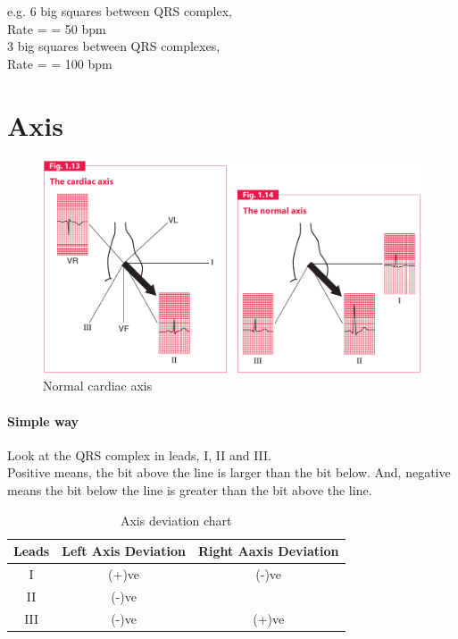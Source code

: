 \documentclass[11pt,a4paper]{report}
\begin{document}
\noindent e.g. 6 big squares between QRS complex,\\
Rate =  = 50 bpm \\
3 big squares between QRS complexes, \\
Rate =  = 100 bpm


\section{Axis}
\begin{figure}[htp]
	\centering \includegraphics[scale=0.43]{CA-NCA.png}
	\centering \caption[Normal cardiac axis]{Normal cardiac axis \cite{hampton2013ecg}}
	\label{Cardiac axis}
\end{figure}

\paragraph{Simple way}
\noindent Look at the QRS complex in leads, I, II and III. \\

\noindent Positive means, the bit above the line is larger than the bit below. And, negative means the bit below the line is greater than the bit above the line. 

\begin{table}[ht]
	\centering
	\caption{Axis deviation chart}
	\begin{tabular}{c c c} 
		\toprule[1.5pt]
		Leads 		 	& Left Axis Deviation 	& Right Aaxis Deviation \\  
		\midrule
		I				& (+)ve 		 		& (-)ve \\ 
		II  			& (-)ve  				&  \\
		III	 			& (-)ve  				& (+)ve \\
		\bottomrule[1.5pt]
	\end{tabular}
	\begin{flushleft} 
	\end{flushleft}
	\label{Systolic BP}
\end{table}
\end{document}
